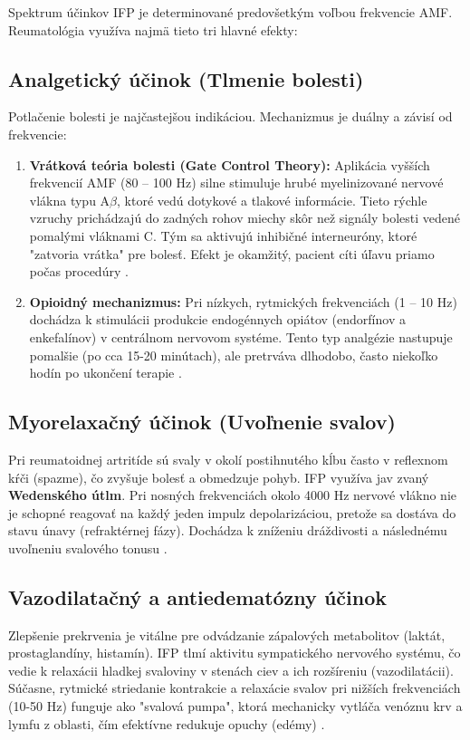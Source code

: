 Spektrum účinkov IFP je determinované predovšetkým voľbou frekvencie AMF. Reumatológia využíva najmä tieto tri hlavné efekty:

\subsection{Analgetický účinok (Tlmenie bolesti)}
Potlačenie bolesti je najčastejšou indikáciou. Mechanizmus je duálny a závisí od frekvencie:
\begin{enumerate}
    \item \textbf{Vrátková teória bolesti (Gate Control Theory):} Aplikácia vyšších frekvencií AMF (80 – 100 Hz) silne stimuluje hrubé myelinizované nervové vlákna typu A$\beta$, ktoré vedú dotykové a tlakové informácie. Tieto rýchle vzruchy prichádzajú do zadných rohov miechy skôr než signály bolesti vedené pomalými vláknami C. Tým sa aktivujú inhibičné interneuróny, ktoré "zatvoria vrátka" pre bolesť. Efekt je okamžitý, pacient cíti úľavu priamo počas procedúry \parencite{Kolar2012}.
    \item \textbf{Opioidný mechanizmus:} Pri nízkych, rytmických frekvenciách (1 – 10 Hz) dochádza k stimulácii produkcie endogénnych opiátov (endorfínov a enkefalínov) v centrálnom nervovom systéme. Tento typ analgézie nastupuje pomalšie (po cca 15-20 minútach), ale pretrváva dlhodobo, často niekoľko hodín po ukončení terapie \parencite{Navratil2019}.
\end{enumerate}

\subsection{Myorelaxačný účinok (Uvoľnenie svalov)}
Pri reumatoidnej artritíde sú svaly v okolí postihnutého kĺbu často v reflexnom kŕči (spazme), čo zvyšuje bolesť a obmedzuje pohyb. IFP využíva jav zvaný \textbf{Wedenského útlm}. Pri nosných frekvenciách okolo 4000 Hz nervové vlákno nie je schopné reagovať na každý jeden impulz depolarizáciou, pretože sa dostáva do stavu únavy (refraktérnej fázy). Dochádza k zníženiu dráždivosti a následnému uvoľneniu svalového tonusu \parencite{Podebradsky2009}.

\subsection{Vazodilatačný a antiedematózny účinok}
Zlepšenie prekrvenia je vitálne pre odvádzanie zápalových metabolitov (laktát, prostaglandíny, histamín). IFP tlmí aktivitu sympatického nervového systému, čo vedie k relaxácii hladkej svaloviny v stenách ciev a ich rozšíreniu (vazodilatácii). Súčasne, rytmické striedanie kontrakcie a relaxácie svalov pri nižších frekvenciách (10-50 Hz) funguje ako "svalová pumpa", ktorá mechanicky vytláča venóznu krv a lymfu z oblasti, čím efektívne redukuje opuchy (edémy) \parencite{Capko2010}.


